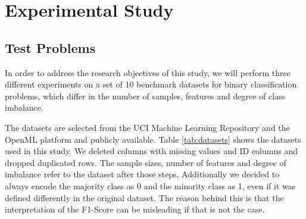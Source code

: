 \documentclass[manuscript, review, anonymous]{acmart} %
\begin{document}
\section{Experimental Study}
\label{cha:setup}
\subsection{Test Problems}
\label{sec:problems}
In order to address the research objectives of this study,
we will perform three different experiments on a set of
10 benchmark datasets for binary classification problems,
which differ in the number of samples, features and degree
of class imbalance.

\noindent The datasets are selected from the UCI Machine Learning Repository
\cite{dua2017uci}
and the OpenML platform \cite{vanschoren} and publicly available.
Table \ref{tab:datasets} shows the datasets used in this study.
We deleted columns with missing values and ID columns and
dropped duplicated rows. The sample sizes, number of features and degree of imbalance
refer to the dataset after those steps.
Additionally we decided to always encode the majority class as
0 and the minority class as 1,
even if it was defined differently in the original dataset.
The reason behind this is that the interpretation of the
F1-Score can be misleading if that is not the case.
\end{document}
